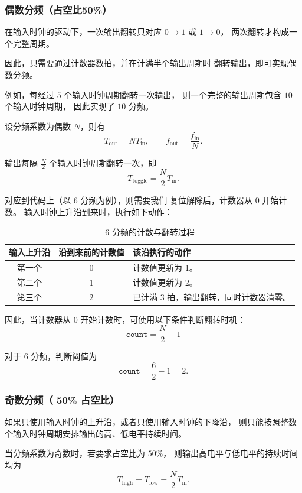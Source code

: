 

\subsubsection{偶数分频（占空比50\%）}


在输入时钟的驱动下，一次输出翻转只对应
$0\rightarrow 1$ 或 $1\rightarrow 0$，
两次翻转才构成一个完整周期。

因此，只需要通过计数器数拍，并在计满半个输出周期时
翻转输出，即可实现偶数分频。

例如，每经过 $5$ 个输入时钟周期翻转一次输出，
则一个完整的输出周期包含 $10$ 个输入时钟周期，
因此实现了 $10$ 分频。

设分频系数为偶数 $N$，则有
\[
T_{\mathrm{out}} = N T_{\mathrm{in}},
\qquad
f_{\mathrm{out}} = \frac{f_{\mathrm{in}}}{N}.
\]

输出每隔 $\frac{N}{2}$ 个输入时钟周期翻转一次，即
\[
T_{\mathrm{toggle}} = \frac{N}{2}T_{\mathrm{in}}.
\]

对应到代码上（以 6 分频为例），则需要我们
复位解除后，计数器从 $0$ 开始计数。
输入时钟上升沿到来时，执行如下动作：

\begin{table}[H]
  \centering
  \caption{6 分频的计数与翻转过程}
  \begin{tabularx}{\textwidth}{ccX}
    \toprule
    输入上升沿 & 沿到来前的计数值 & 该沿执行的动作 \\
    \midrule
    第一个 & 0 & 计数值更新为 1。 \\
    第二个 & 1 & 计数值更新为 2。 \\
    第三个 & 2 & 已计满 3 拍，输出翻转，同时计数器清零。 \\
    \bottomrule
  \end{tabularx}
\end{table}

因此，当计数器从 $0$ 开始计数时，可使用以下条件判断翻转时机：
\[
\boxed{\texttt{count} = \frac{N}{2}-1}
\]

对于 $6$ 分频，判断阈值为
\[
\texttt{count} = \frac{6}{2}-1 = 2.
\]

\subsubsection{奇数分频（ 50\% 占空比）}

如果只使用输入时钟的上升沿，或者只使用输入时钟的下降沿，
则只能按照整数个输入时钟周期安排输出的高、低电平持续时间。

当分频系数为奇数时，若要求占空比为 $50\%$，
则输出高电平与低电平的持续时间均为
\[
T_{\mathrm{high}} = T_{\mathrm{low}}
= \frac{N}{2}T_{\mathrm{in}}.
\]

